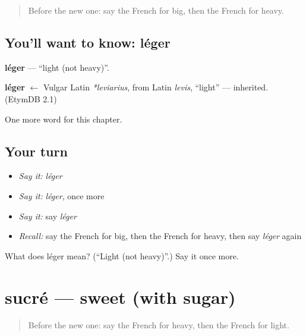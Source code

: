 \label{lesson:FR-C93-leger}



\begin{quote}
Before the new one: say the French for big, then the French for heavy.
\end{quote}

\subsection*{You'll want to know: léger}
\textbf{léger} — \textquotedblleft{}light (not heavy)\textquotedblright{}.

\begin{cousinweb}
\textbf{léger} $\leftarrow$ Vulgar Latin \emph{*leviarius}, from Latin \emph{levis}, \textquotedblleft{}light\textquotedblright{} — inherited. (EtymDB 2.1)
\end{cousinweb}

\begin{grammarlens}[title={What you've built}]
One more word for this chapter.
\end{grammarlens}

\subsection*{Your turn}
\begin{itemize}
\raggedright
  \item \emph{Say it:} \emph{léger}
  \item \emph{Say it:} \emph{léger}, once more
  \item \emph{Say it:} say \emph{léger}
  \item \emph{Recall:} say the French for big, then the French for heavy, then say \emph{léger} again
\end{itemize}

\begin{tcolorbox}[breakable,colback=teal!4,colframe=teal!35!black,title={Before you move on}]
What does léger mean? (\textquotedblleft{}Light (not heavy)\textquotedblright{}.) Say it once more.
\end{tcolorbox}
\section[sucré]{sucré — sweet (with sugar)}

\label{lesson:FR-C93-sucre}



\begin{quote}
Before the new one: say the French for heavy, then the French for light.
\end{quote}

